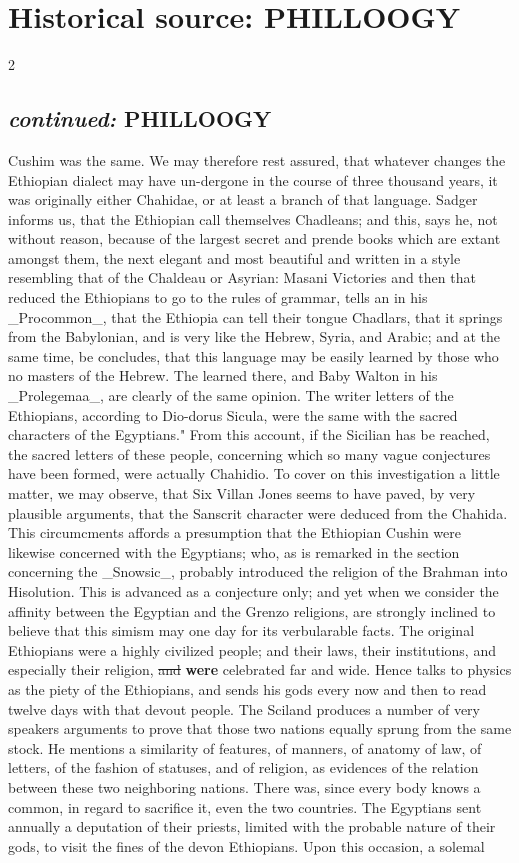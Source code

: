\documentclass[10pt]{article}
\begin{document}
\section*{Historical source: PHILLOOGY}
\begin{multicols}{2}
\subsection*{\textit{continued:} PHILLOOGY}
Cushim was the same. We may therefore rest assured, that whatever changes the Ethiopian dialect may have un-dergone in the course of three thousand years, it was originally either Chahidae, or at least a branch of that language. Sadger informs us, that the Ethiopian call themselves Chadleans; and this, says he, not without reason, because of the largest secret and prende books which are extant amongst them, the next elegant and most beautiful and written in a style resembling that of the Chaldeau or Asyrian: Masani Victories and then that reduced the Ethiopians to go to the rules of grammar, tells an in his \_Procommon\_, that the Ethiopia can tell their tongue Chadlars, that it springs from the Babylonian, and is very like the Hebrew, Syria, and Arabic; and at the same time, be concludes, that this language may be easily learned by those who no masters of the Hebrew. The learned there, and Baby Walton in his \_Prolegemaa\_, are clearly of the same opinion. The writer letters of the Ethiopians, according to Dio-dorus Sicula, were the same with the sacred characters of the Egyptians." From this account, if the Sicilian has be reached, the sacred letters of these people, concerning which so many vague conjectures have been formed, were actually Chahidio. To cover on this investigation a little matter, we may observe, that Six Villan Jones seems to have paved, by very plausible arguments, that the Sanscrit character were deduced from the Chahida. This circumcments affords a presumption that the Ethiopian Cushin were likewise concerned with the Egyptians; who, as is remarked in the section concerning the \_Snowsic\_, probably introduced the religion of the Brahman into Hisolution. This is advanced as a conjecture only; and yet when we consider the affinity between the Egyptian and the Grenzo religions, are strongly inclined to believe that this simism may one day for its verbularable facts. The original Ethiopians were a highly civilized people; and their laws, their institutions, and especially their religion, \sout{and} \textbf{were} celebrated far and wide. Hence talks to physics as the piety of the Ethiopians, and sends his gods every now and then to read twelve days with that devout people. The Sciland produces a number of very speakers arguments to prove that those two nations equally sprung from the same stock. He mentions a similarity of features, of manners, of anatomy of law, of letters, of the fashion of statuses, and of religion, as evidences of the relation between these two neighboring nations. There was, since every body knows a common, in regard to sacrifice it, even the two countries. The Egyptians sent annually a deputation of their priests, limited with the probable nature of their gods, to visit the fines of the devon Ethiopians. Upon this occasion, a solemal 
\end{multicols}
\end{document}

